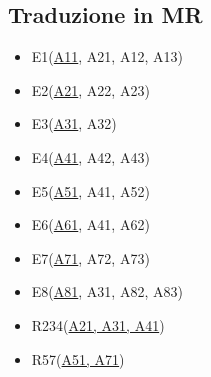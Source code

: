\subsection{Traduzione in MR}
\begin{itemize}
    \item E1(\underline{A11}, A21, A12, A13)
    \item E2(\underline{A21}, A22, A23)
    \item E3(\underline{A31}, A32)
    \item E4(\underline{A41}, A42, A43)
    \item E5(\underline{A51}, A41, A52)
    \item E6(\underline{A61}, A41, A62)
    \item E7(\underline{A71}, A72, A73)
    \item E8(\underline{A81}, A31, A82, A83)
    \item R234(\underline{A21, A31, A41})
    \item R57(\underline{A51, A71})
\end{itemize}